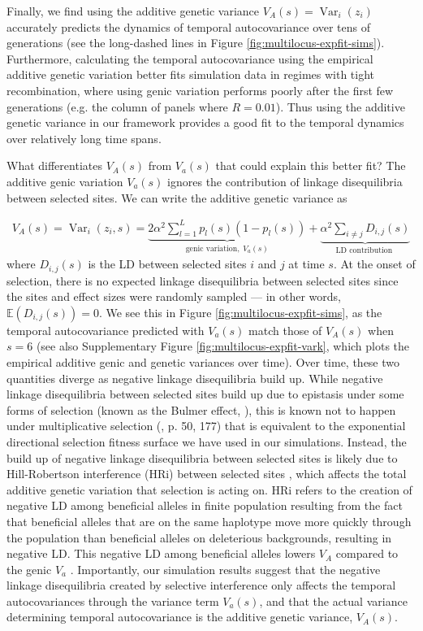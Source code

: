 \documentclass[11pt]{article}
\newcommand{\E}{\mathbb{E}}
\DeclareMathOperator{\var}{Var}
\begin{document}
Finally, we find using the additive genetic variance $V_A(s) = \var_i(z_i)$
accurately predicts the dynamics of temporal autocovariance over tens of
generations (see the long-dashed lines in Figure
\ref{fig:multilocus-expfit-sims}). Furthermore, calculating the temporal
autocovariance using the empirical additive genetic variation better fits
simulation data in regimes with tight recombination, where using genic
variation performs poorly after the first few generations (e.g. the column of
panels where $R=0.01$). Thus using the additive genetic variance in our
framework provides a good fit to the temporal dynamics over relatively long
time spans.

What differentiates $V_A(s)$ from $V_a(s)$ that could explain this better fit?
The additive genic variation $V_a(s)$ ignores the contribution of linkage
disequilibria between selected sites. We can write the additive genetic
variance as

\begin{align}
  V_A(s) = \var_i(z_i, s) = \underbrace{2 \alpha^2 \sum_{l=1}^L p_{l}(s) (1-p_{l}(s))}_{\text{genic variation}, \; V_a(s)} +
  \underbrace{\alpha^2 \sum_{i\ne j} D_{i,j}(s)}_\text{LD contribution }
\label{eq:var-genic-z}
\end{align}
%
where $D_{i,j}(s)$ is the LD between selected sites $i$ and $j$ at time $s$.
At the onset of selection, there is no expected linkage disequilibria between
selected sites since the sites and effect sizes were randomly sampled --- in
other words, $\E(D_{i,j}(s)) = 0$. We see this in Figure
\ref{fig:multilocus-expfit-sims}, as the temporal autocovariance predicted with
$V_a(s)$ match those of $V_A(s)$ when $s = 6$ (see also Supplementary Figure
\ref{fig:multilocus-expfit-vark}, which plots the empirical additive genic and
genetic variances over time). Over time, these two quantities diverge as
negative linkage disequilibria build up. While negative linkage disequilibria
between selected sites build up due to epistasis under some forms of selection
(known as the Bulmer effect, \cite{Bulmer1971-ae,Bulmer1980-zo}), this is known
not to happen under multiplicative selection (\cite{Burger2000-an}, p. 50, 177) that is equivalent to the exponential directional
selection fitness surface we have used in our simulations. Instead, the build
up of negative linkage disequilibria between selected sites is likely due to
Hill-Robertson interference (HRi) between selected sites
\parencite{Hill1966-kd}, which affects the total additive genetic variation
that selection is acting on. HRi refers to the creation of negative LD among
beneficial alleles in finite population resulting from the fact that beneficial
alleles that are on the same haplotype move more quickly through the population
than beneficial alleles on deleterious backgrounds, resulting in negative LD.
This negative LD among beneficial alleles lowers $V_A$ compared to the genic
$V_a$ \parencite{Hill1966-kd,Barton2005-zq,Crouch2017-xr,Good2014-yz}.  Importantly, our
simulation results suggest that the negative linkage disequilibria created by
selective interference only affects the temporal autocovariances through the
variance term $V_a(s)$, and that the actual variance determining temporal
autocovariance is the additive genetic variance, $V_A(s)$.
\end{document}

